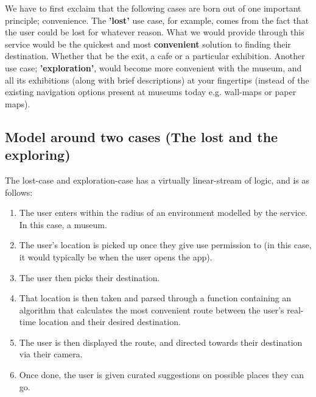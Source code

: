 We have to first exclaim that the following cases are born out of one important principle; convenience. The \textbf{'lost'} use case, for example, comes from the fact that the user could be lost for whatever reason. What we would provide through this service would be the quickest and most \textbf{convenient} solution to finding their destination. Whether that be the exit, a cafe or a particular exhibition. Another use case;
\textbf{'exploration'}, would become more convenient with the museum, and all its exhibitions (along with brief descriptions) at your fingertips (instead of the existing navigation options present at museums today e.g. wall-maps or paper maps).
\subsection*{Model around two cases (The lost and the exploring) }
The lost-case and exploration-case has a virtually linear-stream of logic, and is as follows:
\begin{enumerate}
    \item The user enters within the radius of an environment modelled by the service. In this case, a museum.
    \item The user’s location is picked up once they give use permission to (in this case, it would typically be when the user opens the app). 
    \item The user then picks their destination.
    \item That location is then taken and parsed through a function containing an algorithm that calculates the most convenient route between the user’s real-time location and their desired destination.
    \item The user is then displayed the route, and directed towards their destination via their camera.
    \item Once done, the user is given curated suggestions on possible places they can go.
\end{enumerate}